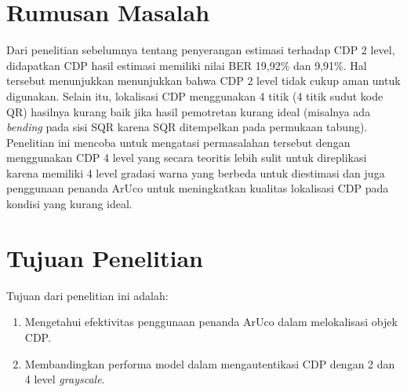 \section{Rumusan Masalah}
Dari penelitian sebelumnya tentang penyerangan estimasi terhadap CDP 2 level, didapatkan CDP hasil estimasi memiliki nilai BER 19,92\% dan 9,91\%. Hal tersebut
menunjukkan menunjukkan bahwa CDP 2 level tidak cukup aman untuk digunakan. Selain itu, lokalisasi CDP menggunakan 4 titik (4 titik sudut kode QR) hasilnya
kurang baik jika hasil pemotretan kurang ideal (misalnya ada \emph{bending} pada sisi SQR karena SQR ditempelkan pada permukaan tabung). Penelitian ini mencoba
untuk mengatasi permasalahan tersebut dengan menggunakan CDP 4 level yang secara teoritis lebih sulit untuk direplikasi karena memiliki 4 level gradasi warna
yang berbeda untuk diestimasi dan juga penggunaan penanda ArUco untuk meningkatkan kualitas lokalisasi CDP pada kondisi yang kurang ideal.

\section{Tujuan Penelitian}Tujuan dari penelitian ini adalah:
\begin{enumerate}
      \item Mengetahui efektivitas penggunaan penanda ArUco dalam melokalisasi objek CDP.
      \item Membandingkan performa model dalam mengautentikasi CDP dengan 2 dan 4 level \emph{grayscale}.
\end{enumerate}

